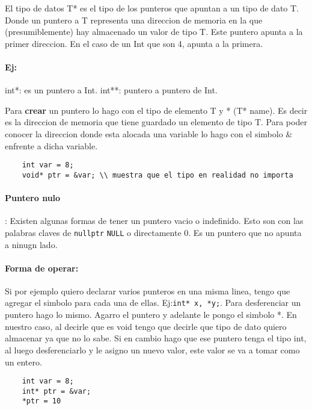 \documentclass[11pt]{article}
\begin{document}
El tipo de datos T* es el tipo de los punteros que apuntan a un tipo de dato T.
Donde un puntero a T representa una direccion de memoria en la que
(presumiblemente) hay almacenado un valor de tipo T.
Este puntero apunta a la primer direccion.
En el caso de un Int que son 4, apunta a la primera.

\paragraph{Ej:} int*: es un puntero a Int.
int**: puntero a puntero de Int.
\vspace{.5cm}

Para \textbf{crear} un puntero lo hago con el tipo de elemento T y * (T* name).
Es decir es la direccion de memoria que tiene guardado un elemento de tipo T.
Para poder conocer la direccion donde esta alocada una variable lo hago con el simbolo
\& enfrente a dicha variable.
\begin{lstlisting}
    int var = 8;
    void* ptr = &var; \\ muestra que el tipo en realidad no importa
\end{lstlisting}
\paragraph{Puntero nulo}: Existen algunas formas de tener un puntero vacio o indefinido.
Esto son con las palabras claves de \texttt{nullptr} \texttt{NULL} o directamente 0.
Es un puntero que no apunta a ninugn lado.


\paragraph{Forma de operar:}



Si por ejemplo quiero declarar varios punteros en una misma linea,
tengo que agregar el simbolo para cada una de ellas.
Ej:\texttt{int* x, *y;}.
Para desferenciar un puntero hago lo mismo.
Agarro el puntero y adelante le pongo el simbolo *.
En nuestro caso, al decirle que es void tengo que decirle que tipo de dato
quiero almacenar ya que no lo sabe.
Si en cambio hago que ese puntero tenga el tipo int, al luego desferenciarlo y
le asigno un nuevo valor, este valor se va a tomar como un entero.

\begin{lstlisting}
    int var = 8;
    int* ptr = &var;
    *ptr = 10
\end{lstlisting}
\end{document}
